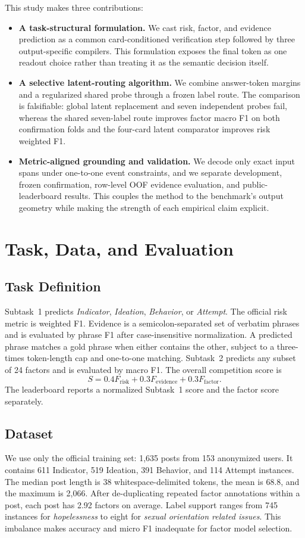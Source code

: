 \documentclass[conference]{IEEEtran}
\begin{document}
This study makes three contributions:
\begin{itemize}
    \item \textbf{A task-structural formulation.} We cast risk, factor, and evidence prediction as a common card-conditioned verification step followed by three output-specific compilers. This formulation exposes the final token as one readout choice rather than treating it as the semantic decision itself.
    \item \textbf{A selective latent-routing algorithm.} We combine answer-token margins and a regularized shared probe through a frozen label route. The comparison is falsifiable: global latent replacement and seven independent probes fail, whereas the shared seven-label route improves factor macro F1 on both confirmation folds and the four-card latent comparator improves risk weighted F1.
    \item \textbf{Metric-aligned grounding and validation.} We decode only exact input spans under one-to-one event constraints, and we separate development, frozen confirmation, row-level OOF evidence evaluation, and public-leaderboard results. This couples the method to the benchmark's output geometry while making the strength of each empirical claim explicit.
\end{itemize}

\section{Task, Data, and Evaluation}
\subsection{Task Definition}
Subtask~1 predicts \emph{Indicator}, \emph{Ideation}, \emph{Behavior}, or \emph{Attempt}. The official risk metric is weighted F1. Evidence is a semicolon-separated set of verbatim phrases and is evaluated by phrase F1 after case-insensitive normalization. A predicted phrase matches a gold phrase when either contains the other, subject to a three-times token-length cap and one-to-one matching. Subtask~2 predicts any subset of 24 factors and is evaluated by macro F1. The overall competition score is
\begin{equation}
S=0.4F_{\mathrm{risk}}+0.3F_{\mathrm{evidence}}+0.3F_{\mathrm{factor}}.
\end{equation}
The leaderboard reports a normalized Subtask~1 score and the factor score separately.

\subsection{Dataset}
We use only the official training set: 1,635 posts from 153 anonymized users. It contains 611 Indicator, 519 Ideation, 391 Behavior, and 114 Attempt instances. The median post length is 38 whitespace-delimited tokens, the mean is 68.8, and the maximum is 2,066. After de-duplicating repeated factor annotations within a post, each post has 2.92 factors on average. Label support ranges from 745 instances for \emph{hopelessness} to eight for \emph{sexual orientation related issues}. This imbalance makes accuracy and micro F1 inadequate for factor model selection.
\end{document}

